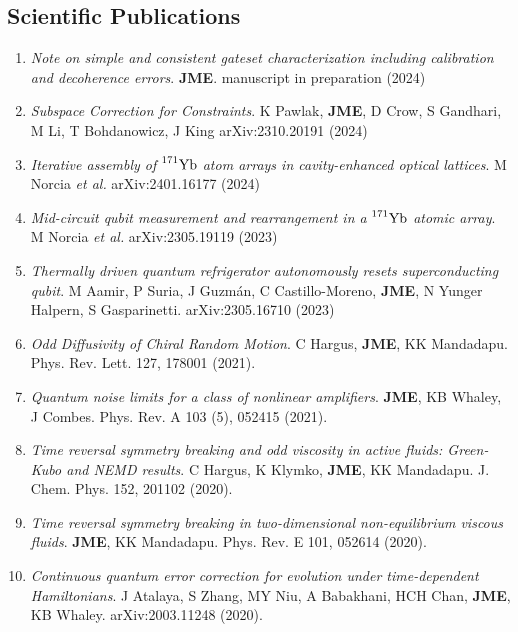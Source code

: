 \documentclass[]{article}
\begin{document}
\subsection*{Scientific Publications}
\begin{enumerate}

\item \textit{Note on simple and consistent gateset characterization including calibration and decoherence errors}. \textbf{JME}. manuscript in preparation (2024)
	
\item \textit{Subspace Correction for Constraints}. K Pawlak, \textbf{JME}, D Crow, S Gandhari, M Li, T Bohdanowicz, J King arXiv:2310.20191 (2024)

\item \textit{Iterative assembly of} $\prescript{171}{}{\textrm{Yb}}$ \textit{atom arrays in cavity-enhanced optical lattices}. M Norcia \textit{et al.} arXiv:2401.16177 (2024)

\item \textit{Mid-circuit qubit measurement and rearrangement in a} $\prescript{171}{}{\textrm{Yb}}$ \textit{atomic array}. M Norcia \textit{et al.} arXiv:2305.19119 (2023)

\item \textit{Thermally driven quantum refrigerator autonomously resets superconducting qubit}.
M Aamir, P Suria, J Guzmán, C Castillo-Moreno, \textbf{JME}, N Yunger Halpern, S Gasparinetti. arXiv:2305.16710 (2023)
	
\item \textit{Odd Diffusivity of Chiral Random Motion}. C Hargus, \textbf{JME}, KK Mandadapu. Phys. Rev. Lett. 127, 178001 (2021).

\item\textit{Quantum noise limits for a class of nonlinear amplifiers}. \textbf{JME}, KB Whaley, J Combes. Phys. Rev. A 103 (5), 052415 (2021).

\item \textit{Time reversal symmetry breaking and odd viscosity in active fluids: Green-Kubo and NEMD results}. C Hargus, K Klymko, \textbf{JME}, KK Mandadapu.  J. Chem. Phys. 152, 201102 (2020).

\item \textit{Time reversal symmetry breaking in two-dimensional non-equilibrium viscous fluids}. \textbf{JME}, KK Mandadapu. Phys. Rev. E 101, 052614 (2020).

\item \textit{Continuous quantum error correction for evolution under time-dependent Hamiltonians}. J Atalaya, S Zhang, MY Niu, A Babakhani, HCH Chan, \textbf{JME}, KB Whaley. 	arXiv:2003.11248 (2020).


\end{enumerate}
\end{document}
